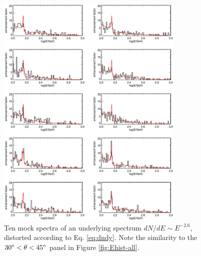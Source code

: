 \documentclass[aps,twocolumn,prd,superscriptaddress,showpacs,nofootinbib,fixfloat]{revtex4}
\newcommand{\degree}{^{\rm o}}
\begin{document}
\begin{figure}
  \centering
  \includegraphics[width=0.8\textwidth]{plots/limb_bump_model_many.ps}
  \caption{Ten mock spectra of an underlying spectrum $dN/dE \sim E^{-2.6}$,
  distorted according to Eq. \ref{eq:dndy}.  Note the similarity to the
  $30\degree < \theta < 45\degree$ panel in Figure \ref{fig:Ehist-all}.  }
  \label{fig:bumpmodelmany}
\end{figure}
\end{document}
